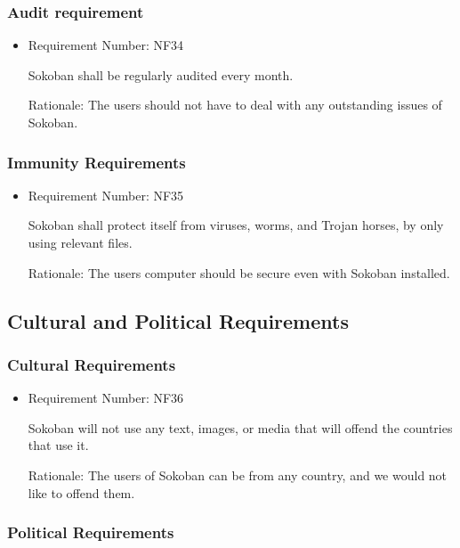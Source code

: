 \documentclass[12pt, titlepage]{article}
\begin{document}
\subsubsection{Audit requirement}
\begin{itemize}
    \item Requirement Number: NF34
    
Sokoban shall be regularly audited every month.
     
    Rationale: The users should not have to deal with any outstanding issues of Sokoban.
\end{itemize}


\subsubsection{Immunity Requirements}

\begin{itemize}
    \item Requirement Number: NF35
    
Sokoban shall protect itself from viruses, worms, and Trojan horses, by only using relevant files.
     
    Rationale: The users computer should be secure even with Sokoban installed.
\end{itemize}

\subsection{Cultural and Political Requirements}

\subsubsection{Cultural Requirements}

\begin{itemize}
    \item Requirement Number: NF36
    
Sokoban will not use any text, images, or media that will offend the countries that use it. 
     
    Rationale: The users of Sokoban can be from any country, and we would not like to offend them.
\end{itemize}


\subsubsection{Political Requirements}
\end{document}
